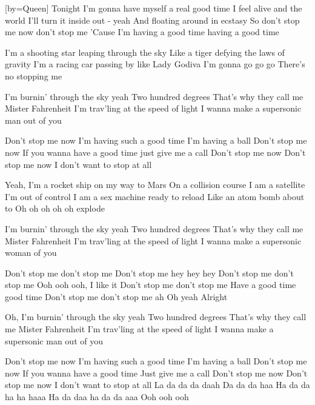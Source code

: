 [by={Queen}]
\beginverse
Tonight I'm gonna have myself a real good time
I feel alive and the world I'll turn it inside out - yeah
And floating around in ecstasy
So don't stop me now don't stop me
'Cause I'm having a good time having a good time
\endverse

\beginchorus
I'm a shooting star leaping through the sky
Like a tiger defying the laws of gravity
I'm a racing car passing by like Lady Godiva
I'm gonna go go go
There's no stopping me
\endchorus 

\beginverse
I'm burnin' through the sky yeah
Two hundred degrees
That's why they call me Mister Fahrenheit
I'm trav'ling at the speed of light
I wanna make a supersonic man out of you
\endverse

\beginchorus
Don't stop me now I'm having such a good time
I'm having a ball
Don't stop me now
If you wanna have a good time just give me a call
Don't stop me now 
Don't stop me now 
I don't want to stop at all
\endchorus 

\beginverse
Yeah, I'm a rocket ship on my way to Mars
On a collision course
I am a satellite I'm out of control
I am a sex machine ready to reload
Like an atom bomb about to
Oh oh oh oh oh explode
\endverse

\beginverse
I'm burnin' through the sky yeah
Two hundred degrees
That's why they call me Mister Fahrenheit
I'm trav'ling at the speed of light
I wanna make a supersonic woman of you
\endverse

\beginchorus
Don't stop me don't stop me
Don't stop me hey hey hey
Don't stop me don't stop me
Ooh ooh ooh, I like it
Don't stop me don't stop me
Have a good time good time
Don't stop me don't stop me ah
Oh yeah
Alright
\endchorus 

\beginverse
Oh, I'm burnin' through the sky yeah
Two hundred degrees
That's why they call me Mister Fahrenheit
I'm trav'ling at the speed of light
I wanna make a supersonic man out of you
\endverse

\beginchorus
Don't stop me now I'm having such a good time
I'm having a ball
Don't stop me now
If you wanna have a good time 
Just give me a call 
Don't stop me now 
Don't stop me now 
I don't want to stop at all
La da da da daah
Da da da haa
Ha da da ha ha haaa
Ha da daa ha da da aaa
Ooh ooh ooh
\endchorus 
\endsong

